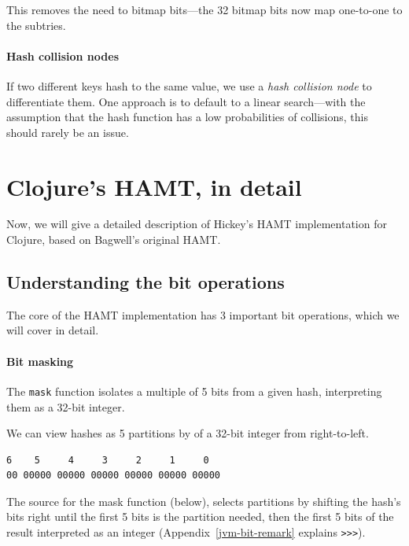 \documentclass[preprint]{sigplanconf}
\begin{document}
This removes the need to bitmap bits---the
32 bitmap bits now map one-to-one to the subtries.

\paragraph{Hash collision nodes}
If two different keys hash to the same value,
we use a \textit{hash collision node}
to differentiate them. One approach
is to default to a linear search---with
the assumption that the hash function
has a low probabilities of collisions,
this should rarely be an issue.


\section{Clojure's HAMT, in detail}
\label{clojure-hamt}

Now, we will give a detailed description of
Hickey's HAMT implementation for Clojure, based
on Bagwell's original HAMT.

\subsection{Understanding the bit operations}

The core of the HAMT implementation has 3 important
bit operations, which we will cover in detail.

\paragraph{Bit masking}

The \texttt{mask} function isolates a multiple of
5 bits from a given hash, interpreting them as
a 32-bit integer.

We can view hashes as 5 partitions
by of a 32-bit integer from right-to-left.

\begin{verbatim}
6    5     4     3     2     1     0
00 00000 00000 00000 00000 00000 00000
\end{verbatim}

The source for the mask function (below),
selects partitions
by
shifting the hash's bits right until the first
5 bits is the partition needed, then the 
first 5 bits of the result
interpreted as an integer
(Appendix~\ref{jvm-bit-remark} explains \texttt{>>>}).
\end{document}
